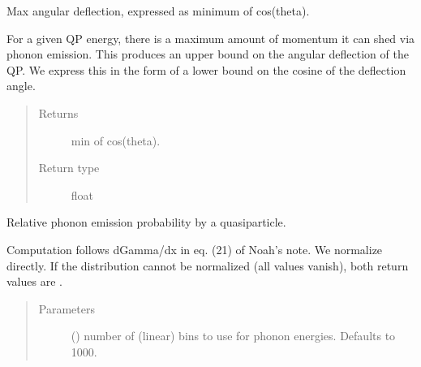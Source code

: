 \documentclass[letterpaper,10pt,english]{sphinxmanual}
\begin{document}
\begin{fulllineitems}
\begin{fulllineitems}
\begin{quote}
\begin{description}
\end{description}\end{quote}

\end{fulllineitems}


\begin{fulllineitems}
\label{\detokenize{code_structure:scdc.interaction.QuasiparticlePhononEmission.min_cos_deflection}}
Max angular deflection, expressed as minimum of cos(theta).

For a given QP energy, there is a maximum amount of momentum it can
shed via phonon emission. This produces an upper bound on the angular
deflection of the QP. We express this in the form of a lower bound on
the cosine of the deflection angle.
\begin{quote}\begin{description}
\item[{Returns}] \leavevmode
min of cos(theta).

\item[{Return type}] \leavevmode
float

\end{description}\end{quote}

\end{fulllineitems}


\begin{fulllineitems}
\label{\detokenize{code_structure:scdc.interaction.QuasiparticlePhononEmission.phonon_energy_distribution}}
Relative phonon emission probability by a quasiparticle.

Computation follows dGamma/dx in eq. (21) of Noah’s note. We normalize
directly. If the distribution cannot be normalized (all values vanish),
both return values are .
\begin{quote}\begin{description}
\item[{Parameters}] \leavevmode
{} (\sphinxstyleliteralemphasis{\sphinxupquote{, }}) \textendash{} number of (linear) bins to use for phonon
energies. Defaults to 1000.


\end{description}
\end{quote}
\end{fulllineitems}
\end{fulllineitems}
\end{document}
